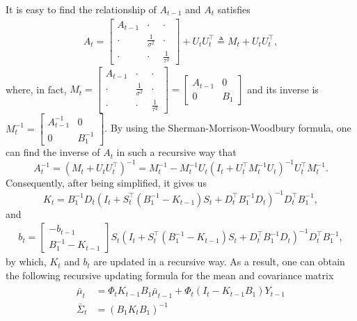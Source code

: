 It is easy to find the relationship of $A_{t-1}$ and $A_{t}$ satisfies  
\begin{align*} A_{t} = 
\begin{bmatrix}
A_{t-1} & \cdot & \cdot  \\ \cdot &\frac{1}{\sigma^2} &\cdot  \\ \cdot  & \cdot  & \frac{1}{\tau^2} 
\end{bmatrix} + U_{t}U_{t}^\top \triangleq M_{t}  + U_{t}U_{t}^\top,
\end{align*}
where, in fact, $M_{t} = \begin{bmatrix}
A_{t-1} & \cdot & \cdot  \\ \cdot &\frac{1}{\sigma^2} &\cdot  \\ \cdot  & \cdot  & \frac{1}{\tau^2}
\end{bmatrix}  = \begin{bmatrix}
A_{t-1} & 0 \\ 0 & B_1
\end{bmatrix}$ 
and its inverse is $M_{t}^{-1} =\begin{bmatrix}
A_{t-1}^{-1} & 0 \\ 0 & B_1^{-1}
\end{bmatrix}$. By using the Sherman-Morrison-Woodbury formula, one can find the inverse of $A_{t}$ in such a recursive way that 
\begin{equation}
A_{t}^{-1} = \left(M_{t}+U_{t}U_{t}^\top\right)^{-1}= M_{t}^{-1}-M_{t}^{-1}U_{t}\left(I_t+U_{t}^\top M_{t}^{-1}U_{t}\right)^{-1}U_{t}^\top M_{t}^{-1}.
\end{equation}
Consequently, after being simplified, it gives us 
\begin{equation}\label{OUupdatingK}
K_{t} =B_1^{-1}D_{t} \left(I_t+ S_{t}^\top \left(B_1^{-1} - K_{t-1}\right)  S_{t} +D_{t}^\top B_1^{-1}D_{t}  \right)^{-1}  D_{t}^\top B_1^{-1},
\end{equation}
and
\begin{align*}
b_{t} = \begin{bmatrix}
-b_{t-1} \\ B_1^{-1}-K_{t-1} 
\end{bmatrix}  S_{t} \left(I_t+ S_{t}^\top \left(B_1^{-1} - K_{t-1}\right)  S_{t} +D_{t}^\top B_1^{-1}D_{t}  \right)^{-1} D_{t}^\top B_1^{-1}, 
\end{align*}
by which, $K_t$ and $b_t$ are updated in a recursive way. As a result, one can obtain the following recursive updating formula for the mean and covariance matrix 
\begin{align}
\begin{split}
\bar{\mu}_{t}&=\Phi_{t} K_{t-1}B_1\bar{\mu}_{t-1} + \Phi_{t} \left(I_t-K_{t-1}B_1\right)Y_{t-1}\\
\bar{\Sigma}_{t}&=\left(B_1K_{t}B_1\right)^{-1}
\end{split}
\end{align}
